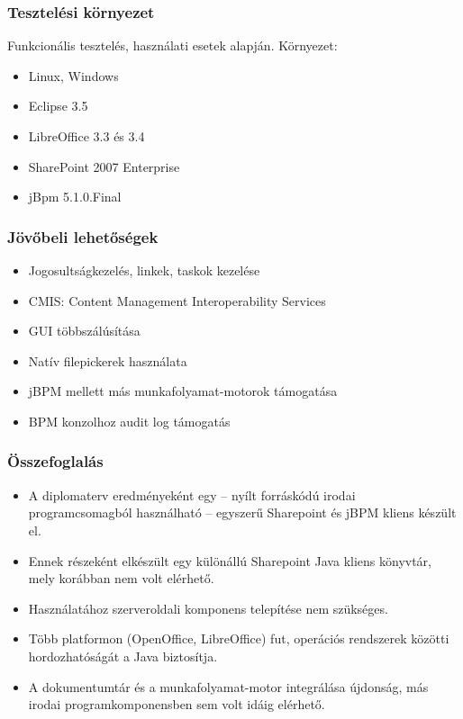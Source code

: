 \documentclass{beamer}
\begin{document}
\begin{frame}
\frametitle{Tesztelési környezet}

Funkcionális tesztelés, használati esetek alapján. Környezet:
\begin{itemize}
\item Linux, Windows
\item Eclipse 3.5
\item LibreOffice 3.3 és 3.4
\item SharePoint 2007 Enterprise
\item jBpm 5.1.0.Final
\end{itemize}

\end{frame}

\begin{frame}
\frametitle{Jövőbeli lehetőségek}
\begin{itemize}
\item Jogosultságkezelés, linkek, taskok kezelése
\item CMIS: Content Management Interoperability Services
\item GUI többszálúsítása
\item Natív filepickerek használata
\item jBPM mellett más munkafolyamat-motorok támogatása
\item BPM konzolhoz audit log támogatás
\end{itemize}
\end{frame}

\begin{frame}
\frametitle{Összefoglalás}
\begin{itemize}
\item A diplomaterv eredményeként egy -- nyílt forráskódú irodai
programcsomagból használható -- egyszerű Sharepoint és jBPM kliens készült el.
\item Ennek részeként elkészült egy különállú Sharepoint Java kliens könyvtár,
mely korábban nem volt elérhető.
\item Használatához szerveroldali komponens telepítése nem szükséges.
\item Több platformon (OpenOffice, LibreOffice) fut, operációs rendszerek
közötti hordozhatóságát a Java biztosítja.
\item A dokumentumtár és a munkafolyamat-motor integrálása újdonság, más irodai
programkomponensben sem volt idáig elérhető.
\end{itemize}
\end{frame}
\end{document}
